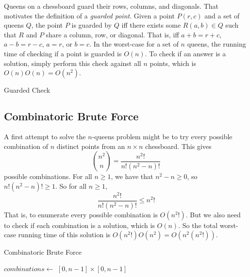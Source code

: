 \documentclass{article}
\begin{document}
Queens on a chessboard guard their rows, columns, and diagonals. That motivates
the definition of a \textit{guarded point}. Given a point $P(r, c)$ and a set
of queens $Q$, the point $P$ is guarded by $Q$ iff there exists some $R(a, b)
\in Q$ such that $R$ and $P$ share a column, row, or diagonal. That is, iff $a
+ b = r + c$, $a - b = r - c$, $a = r$, or $b = c$. In the worst-case for a set
of $n$ queens, the running time of checking if a point is guarded is $O(n)$. To
check if an answer is a solution, simply perform this check against all $n$
points, which is $O(n)O(n) = O(n^2)$.

\begin{algorithm}
    \caption{Guarded Check}


    \;
\end{algorithm}

\subsection*{Combinatoric Brute Force}
\label{sub:combinatoric_brute_force}

A first attempt to solve the $n$-queens problem might be to try every possible
combination of $n$ distinct points from an $n \times n$ chessboard. This gives
$${n^2 \choose n} = \frac{n^2!}{n!(n^2 - n)!}$$ possible combinations. For all
$n \geq 1$, we have that $n^2 - n \geq 0$, so $n!(n^2 - n)! \geq 1$. So for all
$n \geq 1$, $$\frac{n^2!}{n!(n^2 - n)!} \leq n^2!$$ That is, to enumerate every
possible combination is $O(n^2!)$. But we also need to check if each combination
is a solution, which is $O(n)$. So the total worst-case running time of this
solution is $O(n^2!)O(n^2) = O(n^2(n^2!))$.

\begin{algorithm}
    \caption{Combinatoric Brute Force}

    $combinations \leftarrow$ $[0, n-1] \times [0, n-1]$\;
\end{algorithm}
\end{document}
